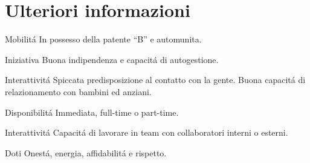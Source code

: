 \documentclass[fontsize=10pt]{tccv}
\begin{document}
\section{Ulteriori informazioni}

\begin{factlist}

\item{Mobilit\'a}
     {In possesso della patente ``B'' e automunita.}

\item{Iniziativa}
     {Buona indipendenza e capacit\'a di autogestione.}

\item{Interattivit\'a}
     {Spiccata predisposizione al contatto con la gente. Buona
      capacit\'a di relazionamento con bambini ed anziani.}

\item{Disponibilit\'a}
     {Immediata, full-time o part-time.}

\item{Interattivit\'a}
     {Capacit\'a di lavorare in team con collaboratori interni o
     esterni.}

\item{Doti}
     {Onest\'a, energia, affidabilit\'a e rispetto.}

\end{factlist}
\end{document}
